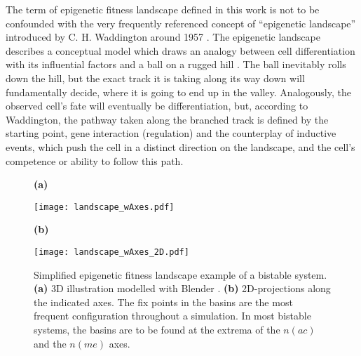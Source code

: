             The term of epigenetic fitness landscape defined in this work is not to be confounded with the very frequently referenced concept of “epigenetic landscape” introduced by C. H. Waddington around 1957 \cite{waddington2014strategy}. The epigenetic landscape describes a conceptual model which draws an analogy between cell differentiation with its influential factors and a ball on a rugged hill \cite{epilandscapeDefEmbryo}. The ball inevitably rolls down the hill, but the exact track it is taking along its way down will fundamentally decide, where it is going to end up in the valley. Analogously, the observed cell's fate will eventually be differentiation, but, according to Waddington, the pathway taken along the branched track is defined by the starting point, gene interaction (regulation) and the counterplay of inductive events, which push the cell in a distinct direction on the landscape, and the cell's competence or ability to follow this path.

            \begin{figure}[!htpb]
                \centering
                \begin{minipage}[t]{\textwidth}
                    \begin{minipage}{0.19\textwidth}
                        \caption*{\small \textbf{(a)}}
                    \end{minipage}
                    \begin{minipage}{0.8\textwidth}
                        \texttt{[image: landscape\_wAxes.pdf]}
                    \end{minipage}
                    \begin{minipage}{0.19\textwidth}
                        \caption*{\small \textbf{(b)}}
                    \end{minipage}
                    \begin{minipage}{0.8\textwidth}
                        \texttt{[image: landscape\_wAxes\_2D.pdf]}
                    \end{minipage}
                \end{minipage}
                \caption{Simplified epigenetic fitness landscape example of a bistable system. \textbf{(a)} 3D illustration modelled with Blender \cite{blender}. \textbf{(b)} 2D-projections along the indicated axes. The fix points in the basins are the most frequent configuration throughout a simulation. In most bistable systems, the basins are to be found at the extrema of the $n(ac)$ and the $n(me)$ axes.}
                \label{img:fitnessLandscape}
            \end{figure}

